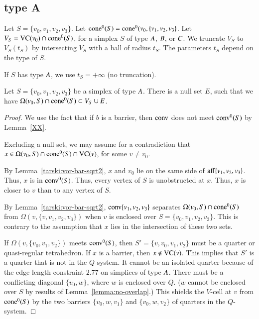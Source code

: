\subsection{type A}%
    \label{sec:separation}

Let $S = \{v_0,v_1,v_2,v_3\}$.
Let ${\operatorname{cone}}^0(S) = {\operatorname{cone}}^0(v_0,\{v_1,v_2,v_3\}$.
Let $V_S = {\operatorname{VC}}(v_0)\cap {\operatorname{cone}}^0(S)$, for a simplex $S$ of type $A$,
$B$, or $C$. 
We truncate $V_S$ to $V_S(t_S)$ by intersecting
$V_S$ with a ball of radius $t_S$.  The parameters $t_S$ depend on
the type of $S$.

If $S$ has type $A$, we use $t_S=+\infty$ (no truncation).

\begin{lemma} Let $S=\{v_0,v_1,v_2,v_3\}$ be a simplex of type $A$.
There is a null set $E$, such that
we have  $ \Omega(v_0,S) \cap {\operatorname{cone}}^0(S) \subset V_S \cup E$.
\end{lemma}

\begin{proof} 
We use the fact that if $b$ is a barrier, then ${\operatorname{conv}}$ does
not meet ${\operatorname{conv}}^0(S)$ by Lemma~\ref{XX}.  


Excluding a null set, we may assume 
for a contradiction that
$x\in \Omega(v_0,S) \cap {\operatorname{cone}}^0(S) \cap {\operatorname{VC}}(v)$,
for some $v\ne v_0$.  

By Lemma~\ref{tarski:vor-bar-sqrt2}, $x$ and $v_0$ lie on the
same side of ${\operatorname{aff}}\{v_1,v_2,v_3\}$.  Thus, $x$ is in
${\operatorname{conv}}^0(S)$.  
Thus, every vertex of $S$ is unobstructed at $x$.  Thus, $x$
is closer to $v$ than to any vertex of $S$.

By Lemma~\ref{tarski:vor-bar-sqrt2}, ${\operatorname{conv}}\{v_1,v_2,v_3\}$ 
separates
$\Omega(v_0,S)\cap {\operatorname{cone}}^0(S)$ from $\Omega(v,\{v,v_1,v_2,v_3\})$ when
$v$ is enclosed over $S=\{v_0,v_1,v_2,v_3\}$.  This is contrary
to the assumption that $x$ lies in the intersection of these
two sets.

If $\Omega(v,\{v_0,v_1,v_2\})$ meets ${\operatorname{conv}}^0(S)$, then
$S'=\{v,v_0,v_1,v_2\}$ must be a quarter or quasi-regular tetrahedron.
If $x$ is a barrier, then $x\not\in{\operatorname{VC}}(v)$.  This implies
that $S'$ is a quarter that is not in the $Q$-system.
It
cannot be an isolated quarter because of the edge length
constraint $2.77$ on simplices of type $A$.
There must be a
conflicting diagonal $\{v_0,w\}$, where $w$ is enclosed over $Q$. ($w$
cannot be enclosed over $S$ by results of
Lemma~\ref{lemma:no-overlap}.) This shields the $V$-cell at $v$
from ${\operatorname{cone}}^0(S)$ by the two barriers $\{v_0,w,v_1\}$ and $\{v_0,w,v_2\}$ of
quarters in the $Q$-system.
\end{proof}


